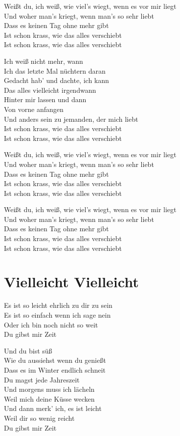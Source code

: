 \documentclass[]{book}
\begin{document}
Weißt du, ich weiß, wie viel's wiegt, wenn es vor mir liegt\\
Und woher man's kriegt, wenn man's so sehr liebt\\
Dass es keinen Tag ohne mehr gibt\\
Ist schon krass, wie das alles verschiebt\\
Ist schon krass, wie das alles verschiebt

Ich weiß nicht mehr, wann\\
Ich das letzte Mal nüchtern daran\\
Gedacht hab' und dachte, ich kann\\
Das alles vielleicht irgendwann\\
Hinter mir lassen und dann\\
Von vorne anfangen\\
Und anders sein zu jemanden, der mich liebt\\
Ist schon krass, wie das alles verschiebt\\
Ist schon krass, wie das alles verschiebt

Weißt du, ich weiß, wie viel's wiegt, wenn es vor mir liegt\\
Und woher man's kriegt, wenn man's so sehr liebt\\
Dass es keinen Tag ohne mehr gibt\\
Ist schon krass, wie das alles verschiebt\\
Ist schon krass, wie das alles verschiebt

Weißt du, ich weiß, wie viel's wiegt, wenn es vor mir liegt\\
Und woher man's kriegt, wenn man's so sehr liebt\\
Dass es keinen Tag ohne mehr gibt\\
Ist schon krass, wie das alles verschiebt\\
Ist schon krass, wie das alles verschiebt

\hypertarget{vielleicht-vielleicht}{%
\section{Vielleicht Vielleicht}\label{vielleicht-vielleicht}}

Es ist so leicht ehrlich zu dir zu sein\\
Es ist so einfach wenn ich sage nein\\
Oder ich bin noch nicht so weit\\
Du gibst mir Zeit

Und du bist süß\\
Wie du aussiehst wenn du genießt\\
Dass es im Winter endlich schneit\\
Du magst jede Jahreszeit\\
Und morgens muss ich lächeln\\
Weil mich deine Küsse wecken\\
Und dann merk' ich, es ist leicht\\
Weil dir so wenig reicht\\
Du gibst mir Zeit
\end{document}
